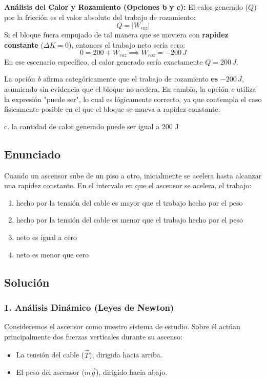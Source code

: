 \documentclass[12pt, a4paper]{article}
\begin{document}
\textbf{Análisis del Calor y Rozamiento (Opciones b y c):}
El calor generado ($Q$) por la fricción es el valor absoluto del trabajo de rozamiento:
$$Q = |W_{roz}|$$
Si el bloque fuera empujado de tal manera que se moviera con \textbf{rapidez constante} ($\Delta K = 0$), entonces el trabajo neto sería cero:
$$0 = 200 + W_{roz} \implies W_{roz} = -200 \, \si{J}$$
En ese escenario específico, el calor generado sería exactamente $Q = 200 \, \si{J}$. 

La opción \textit{b} afirma categóricamente que el trabajo de rozamiento \textbf{es} $-200 \, \si{J}$, asumiendo sin evidencia que el bloque no acelera. En cambio, la opción \textit{c} utiliza la expresión "puede ser", lo cual es lógicamente correcto, ya que contempla el caso físicamente posible en el que el bloque se mueva a rapidez constante.

\begin{tcolorbox}[colback=green!5!white, colframe=green!50!black, title=Respuesta Correcta]
\centering \Large c. la cantidad de calor generado puede ser igual a 200 J
\end{tcolorbox}

\newpage

\subsection*{Enunciado}
Cuando un ascensor sube de un piso a otro, inicialmente se acelera hasta alcanzar una rapidez constante. En el intervalo en que el ascensor se acelera, el trabajo:
\begin{enumerate}[label=\alph*.]
    \item hecho por la tensión del cable es mayor que el trabajo hecho por el peso
    \item hecho por la tensión del cable es menor que el trabajo hecho por el peso
    \item neto es igual a cero
    \item neto es menor que cero
\end{enumerate}

\subsection*{Solución}

\subsubsection*{1. Análisis Dinámico (Leyes de Newton)}
Consideremos el ascensor como nuestro sistema de estudio. Sobre él actúan principalmente dos fuerzas verticales durante su ascenso:
\begin{itemize}
    \item La tensión del cable ($\vec{T}$), dirigida hacia arriba.
    \item El peso del ascensor ($m\vec{g}$), dirigido hacia abajo.
\end{itemize}
\end{document}
